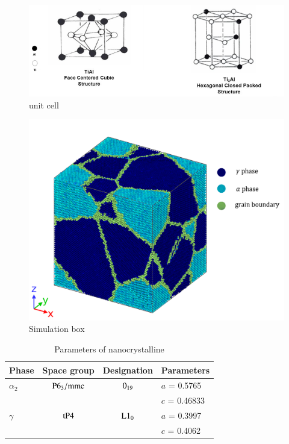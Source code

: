 \documentclass[preview,times]{elsarticle}
\begin{document}
\begin{figure}
	\centering
	\includegraphics[width=1\linewidth]{img/cell}
	\caption{unit cell}
	\label{fig:unit_cell}
\end{figure}

\begin{figure}
	\centering
	\includegraphics[width=1\linewidth]{img/pf_model_labeled}
	\caption{Simulation box}
	\label{fig:simulation_box}
\end{figure}

\begin{table}[ht]
\centering
\caption{Parameters of  nanocrystalline}

\begin{tabular}{l c c l}
\hline
Phase			& Space group		& Designation		& Parameters \\
\hline
$\alpha_2$		& $\rm P6_3/mmc$ 	& $\rm 0_{19}$ 		& $a$ = 0.5765 \\
				&					&					& $c$ = 0.46833 \\
$\gamma$		& $\rm tP4$ 		& $\rm L1_0$		& $a$ = 0.3997 \\
			 	&					&					& $c$ = 0.4062 \\			
\hline
\end{tabular}
\label{tab:lattice_parameter}
\end{table}
  
\end{document}

